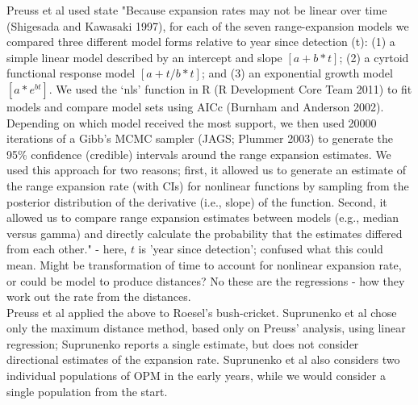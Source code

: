 \documentclass[9pt, reqno]{amsart}
\numberwithin{equation}{section}
\renewcommand{\(}{\left(}
\renewcommand{\)}{\right)}
\theoremstyle{definition}
\theoremstyle{definition}
\theoremstyle{definition}
\begin{document}
	Preuss et al used state "Because expansion rates may not be linear over time (Shigesada and Kawasaki 1997), for each of the seven range-expansion models we compared three different model forms relative to year since detection (t): (1) a simple linear model described by an intercept and slope $[a + b * t]$; (2) a cyrtoid functional response model $[a + t/b * t]$; and (3) an exponential growth model $[a * e^{bt}]$. We used the ‘nls’ function in R (R Development Core Team 2011) to fit models and compare model sets using AICc (Burnham and Anderson 2002). Depending on which model received the most support, we then used 20000 iterations of a Gibb’s MCMC sampler (JAGS; Plummer 2003) to generate the 95\% confidence (credible) intervals around the range expansion estimates. We used this approach for two reasons; first, it allowed us to generate an estimate of the range expansion rate (with CIs) for nonlinear functions by sampling from the posterior distribution of the derivative (i.e., slope) of the function. Second, it allowed us to compare range expansion estimates between models (e.g., median versus gamma) and directly calculate the probability that the estimates differed from each other." - here, $t$ is 'year since detection'; confused what this could mean. Might be transformation of time to account for nonlinear expansion rate, or could be model to produce distances? No these are the regressions - how they work out the rate from the distances. \\

	Preuss et al applied the above to Roesel’s bush-cricket. Suprunenko et al chose only the maximum distance method, based only on Preuss' analysis, using linear regression; Suprunenko reports a single estimate, but does not consider directional estimates of the expansion rate. Suprunenko et al also considers two individual populations of OPM in the early years, while we would consider a single population from the start.
\end{document}

